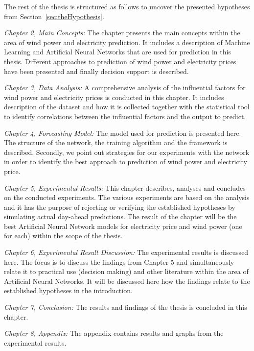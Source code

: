 The rest of the thesis is structured as follows to uncover the presented hypotheses from Section~\ref{sec:theHypothesis}. 

\emph{Chapter 2, Main Concepts:} The chapter presents the main concepts within the area of wind power and electricity prediction. It includes a description of Machine Learning and Artificial Neural Networks that are used for prediction in this thesis. Different approaches to prediction of wind power and electricity prices have been presented and finally decision support is described. 

\emph{Chapter 3, Data Analysis:} A comprehensive analysis of the influential factors for wind power and electricity prices is conducted in this chapter. It includes description of the dataset and how it is collected together with the statistical tool to identify correlations between the influential factors and the output to predict.

\emph{Chapter 4, Forecasting Model:} The model used for prediction is presented here. The structure of the network, the training algorithm and the framework is described. Secondly, we point out strategies for our experiments with the network in order to identify the best approach to prediction of wind power and electricity price. 

\emph{Chapter 5, Experimental Results:} This chapter describes, analyses and concludes on the conducted experiments. The various experiments are based on the analysis and it has the purpose of rejecting or verifying the established hypotheses by simulating actual day-ahead predictions. The result of the chapter will be the best Artificial Neural Network models for electricity price and wind power (one for each) within the scope of the thesis.

\emph{Chapter 6, Experimental Result Discussion:} The experimental results is discussed here. The focus is to discuss the findings from Chapter 5 and simultaneously relate it to practical use (decision making) and other literature within the area of Artificial Neural Networks. It will be discussed here how the findings relate to the established hypotheses in the introduction.  

\emph{Chapter 7, Conclusion:} The results and findings of the thesis is concluded in this chapter.

\emph{Chapter 8, Appendix:} The appendix contains results and graphs from the experimental results.  
